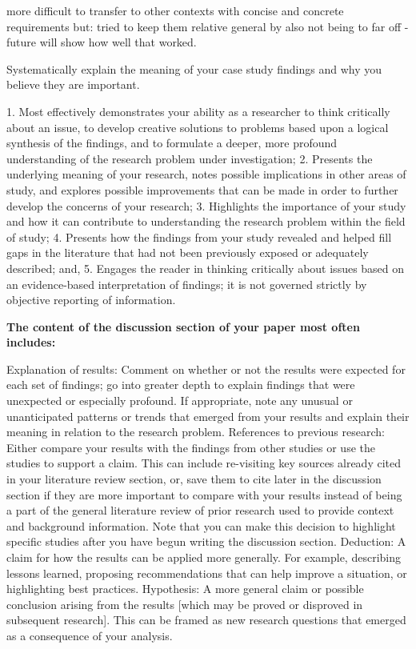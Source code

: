 more difficult to transfer to other contexts with concise and concrete requirements but: tried to keep them relative general by also not being to far off - future will show how well that worked.

Systematically explain the meaning of your case study findings and why you believe they are important. 



1. Most effectively demonstrates your ability as a researcher to think critically about an issue, to develop creative solutions to problems based upon a logical synthesis of the findings, and to formulate a deeper, more profound understanding of the research problem under investigation;
2. Presents the underlying meaning of your research, notes possible implications in other areas of study, and explores possible improvements that can be made in order to further develop the concerns of your research;
3. Highlights the importance of your study and how it can contribute to understanding the research problem within the field of study;
4. Presents how the findings from your study revealed and helped fill gaps in the literature that had not been previously exposed or adequately described; and,
5. Engages the reader in thinking critically about issues based on an evidence-based interpretation of findings; it is not governed strictly by objective reporting of information.


\textbf{The content of the discussion section of your paper most often includes:}

Explanation of results: Comment on whether or not the results were expected for each set of findings; go into greater depth to explain findings that were unexpected or especially profound. If appropriate, note any unusual or unanticipated patterns or trends that emerged from your results and explain their meaning in relation to the research problem.
References to previous research: Either compare your results with the findings from other studies or use the studies to support a claim. This can include re-visiting key sources already cited in your literature review section, or, save them to cite later in the discussion section if they are more important to compare with your results instead of being a part of the general literature review of prior research used to provide context and background information. Note that you can make this decision to highlight specific studies after you have begun writing the discussion section.
Deduction: A claim for how the results can be applied more generally. For example, describing lessons learned, proposing recommendations that can help improve a situation, or highlighting best practices.
Hypothesis: A more general claim or possible conclusion arising from the results [which may be proved or disproved in subsequent research]. This can be framed as new research questions that emerged as a consequence of your analysis.


